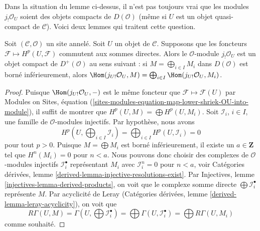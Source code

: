 \noindent
Dans la situation du lemme ci-dessus, il n'est pas toujours vrai que les
modules $j_!\mathcal{O}_U$ soient des objets compacts de $D(\mathcal{O})$
(même si $U$ est un objet quasi-compact de $\mathcal{C}$). Voici deux lemmes
qui traitent cette question.


\begin{lemma}
\label{lemma-when-jshriek-lower-compact}
Soit $(\mathcal{C}, \mathcal{O})$ un site annelé. Soit $U$ un objet de
$\mathcal{C}$. Supposons que les foncteurs
$\mathcal{F} \mapsto H^p(U, \mathcal{F})$ commutent aux sommes directes. Alors
le $\mathcal{O}$-module $j_!\mathcal{O}_U$ est un objet compact de
$D^+(\mathcal{O})$ au sens suivant : si
$M = \bigoplus_{i \in I} M_i$ dans $D(\mathcal{O})$ est borné inférieurement,
alors $\Hom(j_{U!}\mathcal{O}_U, M) =
\bigoplus_{i \in I} \Hom(j_{U!}\mathcal{O}_U, M_i)$.
\end{lemma}

\begin{proof}
Puisque $\Hom(j_{U!}\mathcal{O}_U, -)$ est le même foncteur que
$\mathcal{F} \mapsto \mathcal{F}(U)$ par Modules on Sites, équation
(\ref{sites-modules-equation-map-lower-shriek-OU-into-module}), il suffit de
montrer que $H^p(U, M) = \bigoplus H^p(U, M_i)$. Soit $\mathcal{I}_i$,
$i \in I$, une famille de $\mathcal{O}$-modules injectifs. Par hypothèse,
nous avons
$$
H^p(U, \bigoplus\nolimits_{i \in I} \mathcal{I}_i) =
\bigoplus\nolimits_{i \in I} H^p(U, \mathcal{I}_i) = 0
$$
pour tout $p > 0$. Puisque $M = \bigoplus M_i$ est borné inférieurement, il
existe un $a \in \mathbf{Z}$ tel que $H^n(M_i) = 0$ pour $n < a$. Nous
pouvons donc choisir des complexes de $\mathcal{O}$-modules injectifs
$\mathcal{I}_i^\bullet$ représentant $M_i$ avec $\mathcal{I}_i^n = 0$ pour
$n < a$, voir Catégories dérivées, lemme
\ref{derived-lemma-injective-resolutions-exist}. Par Injectives, lemme
\ref{injectives-lemma-derived-products}, on voit que le complexe somme directe
$\bigoplus \mathcal{I}_i^\bullet$ représente $M$. Par acyclicité de Leray
(Catégories dérivées, lemme \ref{derived-lemma-leray-acyclicity}), on voit que
$$
R\Gamma(U, M) = \Gamma(U, \bigoplus \mathcal{I}_i^\bullet) =
\bigoplus \Gamma(U, \mathcal{I}_i^\bullet) =
\bigoplus R\Gamma(U, M_i)
$$
comme souhaité.
\end{proof}

